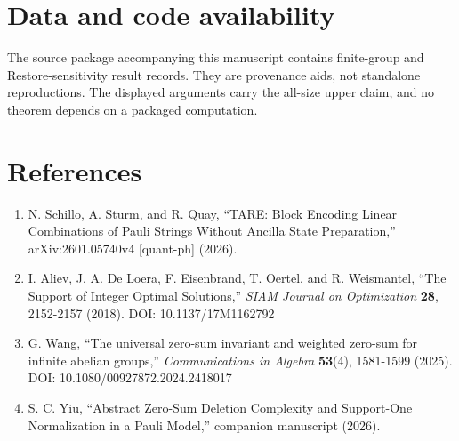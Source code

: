 \documentclass[
  11pt,
]{article}
\providecommand{\tightlist}{%
  \setlength{\itemsep}{0pt}\setlength{\parskip}{0pt}}
\begin{document}
\hypertarget{data-and-code-availability}{%
\section{Data and code availability}\label{data-and-code-availability}}

The source package accompanying this manuscript contains finite-group
and Restore-sensitivity result records. They are provenance aids, not
standalone reproductions. The displayed arguments carry the all-size
upper claim, and no theorem depends on a packaged computation.

\hypertarget{references}{%
\section{References}\label{references}}

\begin{enumerate}
\def\labelenumi{\arabic{enumi}.}
\tightlist
\item
  N. Schillo, A. Sturm, and R. Quay, ``TARE: Block Encoding Linear
  Combinations of Pauli Strings Without Ancilla State Preparation,''
  arXiv:2601.05740v4 {[}quant-ph{]} (2026).
\item
  I. Aliev, J. A. De Loera, F. Eisenbrand, T. Oertel, and R. Weismantel,
  ``The Support of Integer Optimal Solutions,'' \emph{SIAM Journal on
  Optimization} \textbf{28}, 2152-2157 (2018). DOI: 10.1137/17M1162792
\item
  G. Wang, ``The universal zero-sum invariant and weighted zero-sum for
  infinite abelian groups,'' \emph{Communications in Algebra}
  \textbf{53}(4), 1581-1599 (2025). DOI: 10.1080/00927872.2024.2418017
\item
  S. C. Yiu, ``Abstract Zero-Sum Deletion Complexity and Support-One
  Normalization in a Pauli Model,'' companion manuscript (2026).
\end{enumerate}
\end{document}
